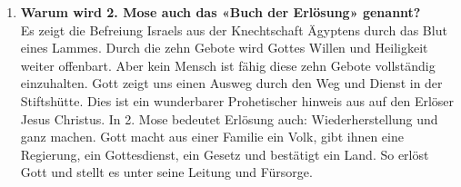 
\begin{enumerate}
    \item \textbf{Warum wird 2. Mose auch das «Buch der Erlösung» genannt?}\\
    Es zeigt die Befreiung Israels aus der Knechtschaft Ägyptens durch das Blut eines Lammes. Durch die zehn Gebote wird Gottes Willen und Heiligkeit weiter offenbart. Aber kein Mensch ist fähig diese zehn Gebote vollständig einzuhalten. Gott zeigt uns einen Ausweg durch den Weg und Dienst in der Stiftshütte. Dies ist ein wunderbarer Prohetischer hinweis aus auf den Erlöser Jesus Christus. In 2. Mose bedeutet Erlösung auch: Wiederherstellung und ganz machen. Gott macht aus einer Familie ein Volk, gibt ihnen eine Regierung, ein Gottesdienst, ein Gesetz und bestätigt ein Land. So erlöst Gott und stellt es unter seine Leitung und Fürsorge.
\end{enumerate}